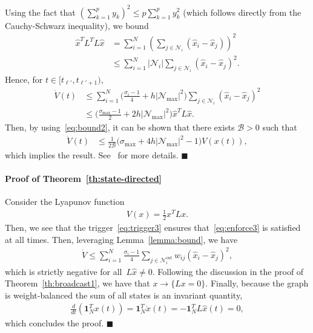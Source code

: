 \documentclass{autart}
\newcommand{\NN}{{\mathcal{N}}}
\newcommand{\BB}{{\mathcal{B}}}
\renewcommand{\hat}{\widehat}
\begin{document}
{Using the fact that $\left( \sum_{k=1}^p y_k \right)^2 \leq p
\sum_{k=1}^p y_k^2$ (which follows directly from the Cauchy-Schwarz
inequality), we bound
\begin{align*}
  \hat{x}^T L^T L \hat{x} & = \sum_{i=1}^N \left( \sum_{j \in \NN_i}
   (\hat{x}_i-\hat{x}_j) \right)^2 
  \\
  & \le \sum_{i=1}^N |\NN_i| \sum_{j \in \NN_i } (\hat{x}_i -
  \hat{x}_j)^2  .
\end{align*}
Hence, for $t \in [t_{\ell'}, t_{\ell'+1})$,
\begin{align*}
  \dot{V}(t) & \leq \sum_{i=1}^N \Big( \frac{\sigma_i - 1}{4} + h
  |\NN_\text{max} |^2 \Big) \sum_{j \in \NN_i} (\hat{x}_i -
  \hat{x}_j)^2
  \\
  & \leq \Big( \frac{\sigma_{\max}-1}{2} + 2 h
   |\NN_\text{max} |^2 \Big) \hat{x}^T L \hat{x} .
\end{align*}
Then, by using~\eqref{eq:bound2}, it can be shown that there exists $\BB > 0$
such that
\begin{align*}
  \dot{V}(t) & \leq \frac{1}{2 \BB }\Big( \sigma_{\max} + 4 h 
  |\NN_\text{max} |^2 - 1 \Big) V(x(t)),
\end{align*}
which implies the result. See~\cite{CN-JC:16-auto} for more details.
\hfill $\blacksquare$


\paragraph*{\textbf{Proof of Theorem~\ref{th:state-directed}}}

Consider the Lyapunov function
\begin{align*}
V(x) = \frac{1}{2}x^T L x .
\end{align*}
Then, we see that the trigger~\eqref{eq:trigger3} ensures that~\eqref{eq:enforce3} is satisfied at all times. Then, leveraging Lemma~\ref{lemma:bound}, we have
\begin{align*}
  \dot{V} \leq \sum_{i=1}^N \frac{\sigma_i - 1}{4} \sum_{j \in
    \NN_i^\text{out}} w_{ij} (\hat{x}_i - \hat{x}_j)^2,
\end{align*}
which is strictly negative for all~$L\hat{x} \neq 0$. Following the
discussion in the proof of Theorem~\ref{th:broadcast1}, we have that
$x \rightarrow \{Lx = 0\}$. Finally, because the graph is
weight-balanced the sum of all states is an
invariant quantity,
\begin{align*}
  \frac{d}{dt} \left( \mathbf{1}^T_N x(t) \right) = \mathbf{1}_N^T
  \dot{x}(t) = -\mathbf{1}_N^T L \hat{x}(t) = 0,
\end{align*}
which concludes the proof. \hfill $\blacksquare$

}
\end{document}
